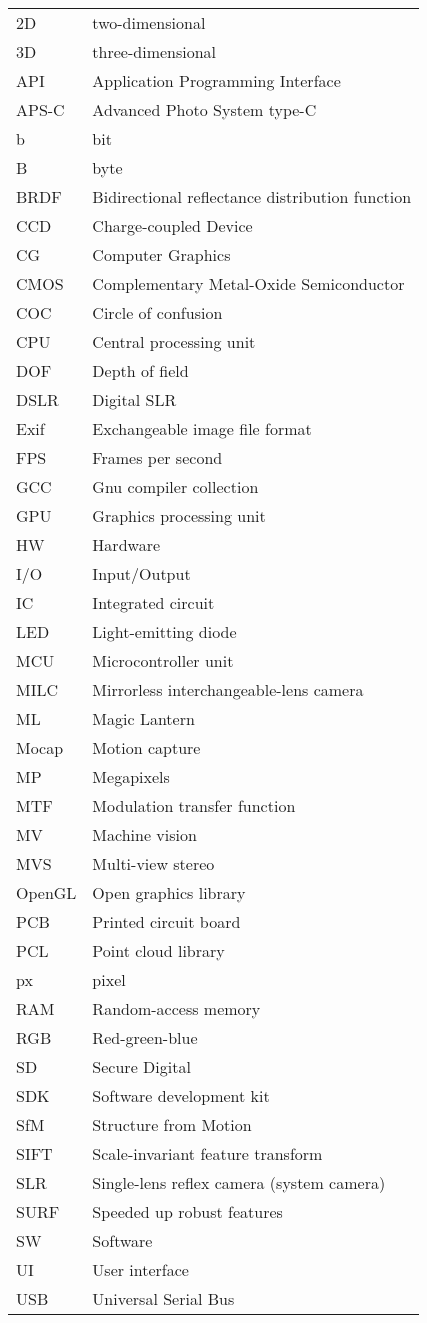 \begin{tabular}{ll}
	2D & two-dimensional\\
	3D & three-dimensional\\
	API & Application Programming Interface\\
	APS-C & Advanced Photo System type-C\\
	b & bit\\
	B & byte\\
	BRDF & Bidirectional reflectance distribution function\\
	CCD & Charge-coupled Device\\
	CG & Computer Graphics\\
	CMOS & Complementary Metal-Oxide Semiconductor\\
	COC & Circle of confusion\\
	CPU & Central processing unit\\
	DOF & Depth of field\\
	DSLR & Digital SLR\\
	Exif & Exchangeable image file format\\
	FPS & Frames per second\\
	GCC & Gnu compiler collection\\
	GPU & Graphics processing unit\\
	HW & Hardware\\
	I/O & Input/Output\\
	IC & Integrated circuit\\
	LED & Light-emitting diode\\
	MCU & Microcontroller unit\\
	MILC & Mirrorless interchangeable-lens camera\\
	ML & Magic Lantern\\
	Mocap & Motion capture\\
	MP & Megapixels\\
	MTF & Modulation transfer function\\
	MV & Machine vision\\
	MVS & Multi-view stereo\\
	OpenGL & Open graphics library\\
	PCB & Printed circuit board\\
	PCL & Point cloud library\\
	px & pixel\\
	RAM & Random-access memory\\
	RGB & Red-green-blue\\
	SD & Secure Digital\\
	SDK & Software development kit\\
	SfM & Structure from Motion\\
	SIFT & Scale-invariant feature transform\\
	SLR & Single-lens reflex camera (system camera)\\
	SURF & Speeded up robust features \\
	SW & Software\\
	UI & User interface\\
	USB & Universal Serial Bus\\
\end{tabular}
